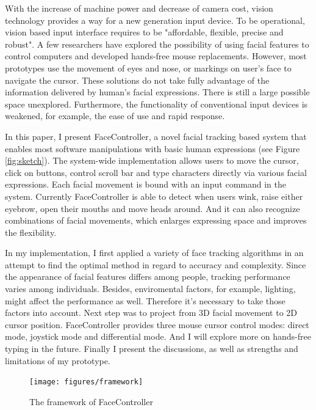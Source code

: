 \documentclass{sigchi}
\begin{document}
With the increase of machine power and decrease of camera cost, vision technology provides a way for a new generation input device. 
To be operational, vision based input interface requires to be "affordable, flexible, precise and robust"\cite{gorodnichy2004nouse}.
A few researchers have explored the possibility of using facial features to control computers and developed hands-free mouse replacements. 
However, most prototypes use the movement of eyes and nose, or markings on user's face to navigate the cursor.
These solutions do not take fully advantage of the information delivered by human's facial expressions.
There is still a large possible space unexplored.
Furthermore, the functionality of conventional input devices is weakened, for example, the ease of use and rapid response.

In this paper, I present FaceController, a novel facial tracking based system that enables most software manipulations with basic human expressions (see Figure \ref{fig:sketch}).
The system-wide implementation allows users to move the cursor, click on buttons, control scroll bar and type characters directly via various facial expressions.
Each facial movement is bound with an input command in the system.
Currently FaceController is able to detect when users wink, raise either eyebrow, open their mouths and move heads around.
And it can also recognize combinations of facial movements, which enlarges expressing space and improves the flexibility.

In my implementation, I first applied a variety of face tracking algorithms in an attempt to find the optimal method in regard to accuracy and complexity.
Since the appearance of facial features differs among people, tracking performance varies among individuals.
Besides, enviromental factors, for example, lighting, might affect the performance as well.
Therefore it's necessary to take those factors into account.
Next step was to project from 3D facial movement to 2D cursor position.
FaceController provides three mouse cursor control modes: direct mode, joystick mode and differential mode.
And I will explore more on hands-free typing in the future.
Finally I present the discussions, as well as strengths and limitations of my prototype.

\begin{figure}[t]
    \centering
    \texttt{[image: figures/framework]}
    \caption{The framework of FaceController}
    \label{fig:fig1}
\end{figure}
\end{document}
